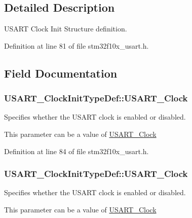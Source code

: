 \subsection{Detailed Description}
U\-S\-A\-R\-T Clock Init Structure definition. 

Definition at line 81 of file stm32f10x\-\_\-usart.\-h.



\subsection{Field Documentation}
\hypertarget{struct_u_s_a_r_t___clock_init_type_def_a229ba7c3f9a4d6d56513e6899f6c6693}{
\subsubsection[{U\-S\-A\-R\-T\-\_\-\-Clock}]{ U\-S\-A\-R\-T\-\_\-\-Clock\-Init\-Type\-Def\-::\-U\-S\-A\-R\-T\-\_\-\-Clock}}\label{struct_u_s_a_r_t___clock_init_type_def_a229ba7c3f9a4d6d56513e6899f6c6693}
\begin{DoxyVerb}   Specifies whether the USART clock is enabled or disabled.
\end{DoxyVerb}
 This parameter can be a value of \hyperlink{group___u_s_a_r_t___clock}{U\-S\-A\-R\-T\-\_\-\-Clock} 

Definition at line 84 of file stm32f10x\-\_\-usart.\-h.

\hypertarget{struct_u_s_a_r_t___clock_init_type_def_afe7a3ea8a61ef7934c43f86ac74581d6}{
\subsubsection[{U\-S\-A\-R\-T\-\_\-\-Clock}]{ U\-S\-A\-R\-T\-\_\-\-Clock\-Init\-Type\-Def\-::\-U\-S\-A\-R\-T\-\_\-\-Clock}}\label{struct_u_s_a_r_t___clock_init_type_def_afe7a3ea8a61ef7934c43f86ac74581d6}
\begin{DoxyVerb}             Specifies whether the USART clock is enabled or disabled.
\end{DoxyVerb}
 This parameter can be a value of \hyperlink{group___u_s_a_r_t___clock}{U\-S\-A\-R\-T\-\_\-\-Clock} 

